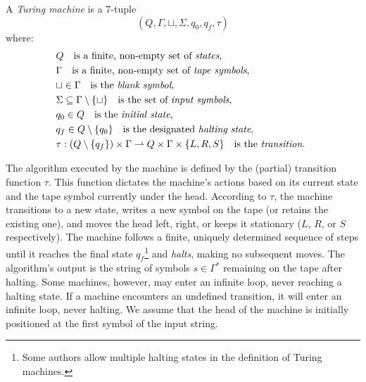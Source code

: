 \begin{definition}
\label{def:Turing-Machine}
A \emph{Turing machine} is a 7-tuple
\[
\left(Q,\Gamma,\sqcup,\Sigma,q_{0},q_{f},\tau\right)
\]
where:
\begin{align*}
 & Q \quad \text{is a finite, non-empty set of \emph{states},} \index{Machine State} \\
 & \Gamma \quad \text{is a finite, non-empty set of \emph{tape symbols},} \index{Tape Symbol} \\
 & \sqcup\in\Gamma \quad \text{is the \emph{blank symbol},} \index{Blank Symbol} \\
 & \Sigma\subseteq\Gamma\setminus\{\sqcup\} \quad \text{is the set of \emph{input symbols},}  \index{Input Symbol} \\
 & q_{0}\in Q \quad \text{is the \emph{initial state},} \index{Initial State} \\
 & q_{f}\in Q \setminus \{q_0\} \quad \text{is the designated \emph{halting state},} \index{Halting State} \\ 
 & \tau:\left(Q\setminus \{q_{f}\}\right)\times\Gamma \rightharpoonup  Q\times\Gamma\times\{L,R,S\} \quad\text{is the \emph{transition}. \index{Transition Function} }
\end{align*}
\end{definition}

The algorithm executed by the machine is defined by the (partial) transition function $\tau$. This function dictates the machine's actions based on its current state and the tape symbol currently under the head. According to $\tau$, the machine transitions to a new state, writes a new symbol on the tape (or retains the existing one), and moves the head left, right, or keeps it stationary ($L$, $R$, or $S$ respectively). The machine follows a finite, uniquely determined sequence of steps until it reaches the final state $q_f$\footnote{Some authors allow multiple halting states in the definition of Turing machines.} and \emph{halts}, making no subsequent moves. The algorithm's output is the string of symbols $s \in \Gamma^\ast$ remaining on the tape after halting. Some machines, however, may enter an infinite loop, never reaching a halting state. If a machine encounters an undefined transition, it will enter an infinite loop, never halting. We assume that the head of the machine is initially positioned at the first symbol of the input string.

